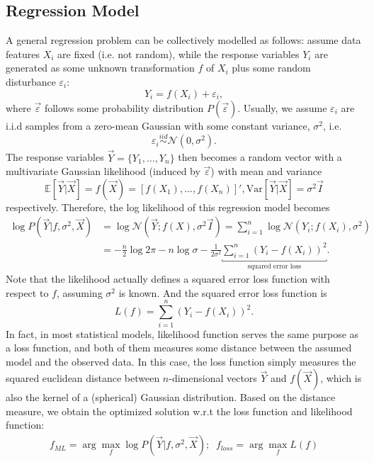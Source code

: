 \documentclass[runningheads,a4paper]{llncs}
\newcommand{\E}[1]{\ensuremath{\mathbb{E}\left[#1\right]}}
\newcommand{\Var}[1]{\mathrm{Var}[#1]}
\begin{document}
\subsection{Regression Model} %
\label{sub:linear_regression_as_an_example}
A general regression problem can be collectively modelled as follows: assume data features $X_i$ are fixed (i.e. not random), while the response variables $Y_i$ are generated as some unknown transformation $f$ of $X_i$ plus some random disturbance $\varepsilon_i$:  
\begin{equation}
    Y_i = f(X_i) + \varepsilon_i,
\end{equation} where $\vec{\varepsilon}$ follows some probability distribution $P(\vec{\varepsilon}).$ Usually, we assume $\varepsilon_i$ are i.i.d samples from a zero-mean Gaussian with some constant variance, $\sigma^2$, i.e. \[\varepsilon_i \stackrel{iid}{\sim}\mathcal{N}(0, \sigma^2).\] The response variables $\vec{Y} = \{Y_1, \ldots, Y_n\}$ then becomes a random vector with a multivariate Gaussian likelihood (induced by $\vec{\varepsilon}$) with mean and variance \[\E{\vec{Y}|\vec{X}} = {f}(\vec{X}) = [f(X_1), \ldots, f(X_n)]', \Var{\vec{Y}|\vec{X}} = \sigma^2\vec{I} \] respectively.
Therefore, the log likelihood of this regression model becomes \begin{align*}
    \log P(\vec{Y}| f, \sigma^2, \vec{X})& = \log \mathcal{N} (\vec{Y}; f(X), \sigma^2\vec{I}) = \sum_{i=1}^n \log \mathcal{N}( Y_i; f(X_i), \sigma^2) \\ & = -\frac{n}{2} \log 2\pi -n\log\sigma - \frac{1}{2\sigma^2}\underbracket{\sum_{i=1}^n (Y_i - f(X_i))^2}_{\text{squared error loss}}.
\end{align*} Note that the likelihood actually defines a squared error loss function with respect to $f$, assuming $\sigma^2$ is known. And the squared error loss function is \[L(f) = \sum_{i=1}^n (Y_i - f(X_i))^2.\] In fact, in most statistical models, likelihood function serves the same purpose as a loss function, and both of them measures some distance between the assumed model and the observed data. In this case, the loss function simply measures the squared euclidean distance between $n$-dimensional vectors $\vec{Y}$ and $f(\vec{X})$, which is also the kernel of a (spherical) Gaussian distribution. Based on the distance measure, we obtain the optimized solution w.r.t the loss function and likelihood function: \begin{align}
    f_{ML} =\arg\max_{f} \log P(\vec{Y}| f, \sigma^2, \vec{X});\;\; f_{loss} =\arg\max_{f} L(f)
\end{align}
\end{document}
